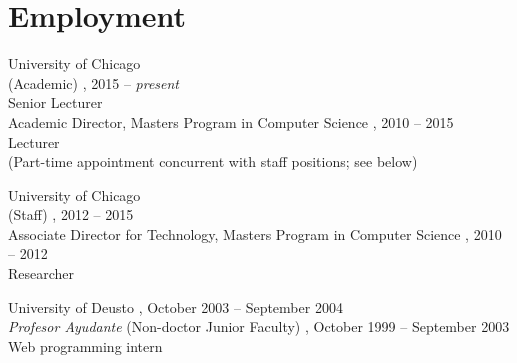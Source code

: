 \documentclass{resume}
\author{Borja Sotomayor}
\begin{document}
\maketitle	

\section*{\hspace{-1cm}Employment}
\begin{category}{University of Chicago\\(Academic)}
, 2015 -- \emph{present}\\
Senior Lecturer\\
Academic Director, Masters Program in Computer Science
, 2010 -- 2015\\
Lecturer\\
(Part-time appointment concurrent with staff positions; see below)
\end{category}
\begin{category}{University of Chicago\\(Staff)}
, 2012 -- 2015\\
Associate Director for Technology, Masters Program in Computer Science
, 2010 -- 2012\\
Researcher
\end{category}
\begin{category}{University of Deusto}
, October 2003 -- September 2004\\
\emph{Profesor Ayudante} (Non-doctor Junior Faculty)
, October 1999 -- September 2003\\
Web programming intern
\end{category}

\end{document}
